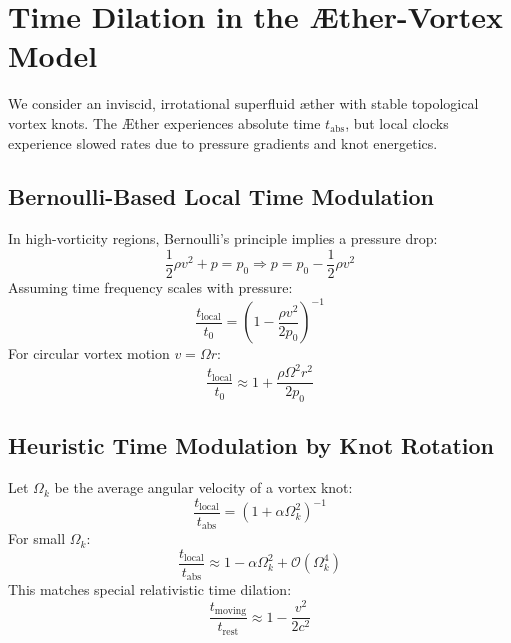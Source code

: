 

    \section{Time Dilation in the Æther-Vortex Model}\label{sec:time}
    We consider an inviscid, irrotational superfluid æther with stable topological vortex knots. The Æther experiences absolute time $t_{\text{abs}}$, but local clocks experience slowed rates due to pressure gradients and knot energetics.

    \subsection{Bernoulli-Based Local Time Modulation}
    In high-vorticity regions, Bernoulli's principle implies a pressure drop:
    \begin{equation}
        \frac{1}{2} \rho v^2 + p = p_0 \Rightarrow p = p_0 - \frac{1}{2} \rho v^2
    \end{equation}
    Assuming time frequency scales with pressure:
    \begin{equation}
        \frac{t_{\text{local}}}{t_0} = \left(1 - \frac{\rho v^2}{2p_0} \right)^{-1}
    \end{equation}
    For circular vortex motion $v = \Omega r$:
    \begin{equation}
        \frac{t_{\text{local}}}{t_0} \approx 1 + \frac{\rho \Omega^2 r^2}{2p_0}
    \end{equation}

    \subsection{Heuristic Time Modulation by Knot Rotation}
    Let $\Omega_k$ be the average angular velocity of a vortex knot:
    \begin{equation}
        \label{eq:omegamod}
        \frac{t_{\text{local}}}{t_{\text{abs}}} = \left(1 + \alpha \Omega_k^2 \right)^{-1}
    \end{equation}
    For small $\Omega_k$:
    \begin{equation}
        \frac{t_{\text{local}}}{t_{\text{abs}}} \approx 1 - \alpha \Omega_k^2 + \mathcal{O}(\Omega_k^4)
    \end{equation}
    This matches special relativistic time dilation:
    \begin{equation}
        \frac{t_{\text{moving}}}{t_{\text{rest}}} \approx 1 - \frac{v^2}{2c^2}
    \end{equation}

